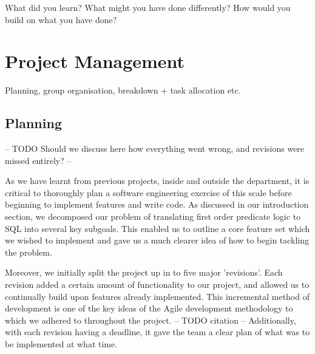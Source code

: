 \documentclass[a4wide, 11pt]{article}
\begin{document}
        What did you learn? What might you have done differently?
        How would you build on what you have done? 

\section{Project Management}

        Planning, group organisation, breakdown + task allocation etc.

\subsection{Planning}

-- TODO Should we discuss here how everything went wrong, and revisions were
missed entirely? --

As we have learnt from previous projects, inside and outside the department, it
is critical to thoroughly plan a software engineering exercise of this scale
before beginning to implement features and write code. As discussed in our
introduction section, we decomposed our problem of translating first order
predicate logic to SQL into several key subgoals. This enabled us to outline a
core feature set which we wished to implement and gave us a much clearer idea
of how to begin tackling the problem.

Moreover, we initially split the project up in to five major 'revisions'. Each
revision added a certain amount of functionality to our project, and allowed us
to continually build upon features already implemented. This incremental method
of development is one of the key ideas of the Agile development methodology to
which we adhered to throughout the project. -- TODO citation -- Additionally,
with each revision having a deadline, it gave the team a clear plan of what was
to be implemented at what time.
\end{document}
